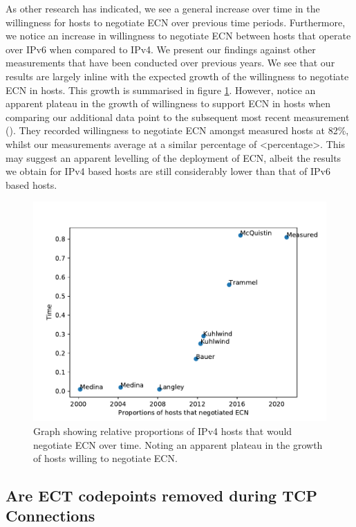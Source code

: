 \documentclass{l4proj}
\begin{document}
As other research has indicated, we see a general increase over time in the willingness for hosts to negotiate ECN over previous time periods. Furthermore, we notice an increase in willingness to negotiate ECN between hosts that operate over IPv6 when compared to IPv4.  We present our findings against other measurements that have been conducted over previous years. We see that our results are largely inline with the expected growth of the willingness to negotiate ECN in hosts. This growth is summarised in figure \ref{fig:ecngrowth}. However, notice an apparent plateau in the growth of willingness to support ECN in hosts when comparing our additional data point to the subsequent most recent measurement (\cite{mcquistin_is_2015}). They recorded willingness to negotiate ECN amongst measured hosts at 82\%, whilst our measurements average at a similar percentage of <percentage>. This may suggest an apparent levelling of the deployment of ECN, albeit the results we obtain for IPv4 based hosts are still considerably lower than that of IPv6 based hosts.

\begin{figure}[H]
    \centering
    \includegraphics[scale=0.7]{dissertation/images/ecn_trends.pdf}
    \caption{Graph showing relative proportions of IPv4 hosts that would negotiate ECN over time. Noting an apparent plateau in the growth of hosts willing to negotiate ECN.}
    \label{fig:ecngrowth}
\end{figure}


\subsection{Are ECT codepoints removed during TCP Connections}
\end{document}
